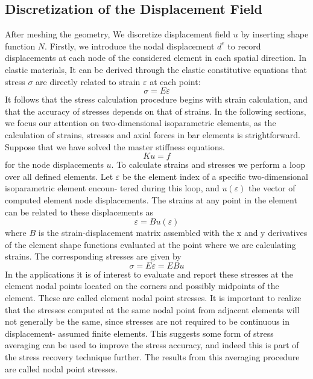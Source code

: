 \subsection{Discretization of the Displacement Field}
After meshing the geometry, We discretize displacement field $u$ by inserting shape function $N$. Firstly, we introduce the nodal displacement $d^e$ to record displacements at each node of the considered element in each spatial direction.
In elastic materials, It can be derived through the elastic constitutive equations that stress $\sigma$ are directly related to strain $\varepsilon$ at each point:
\begin{equation}
\sigma = E\varepsilon
\end{equation}
It follows that the stress calculation procedure begins with strain calculation, and that the accuracy of stresses depends on that of strains. In the following sections, we focus our attention on two-dimensional isoparametric elements, as the calculation of strains, stresses and axial forces in bar elements is strightforward. Suppose that we have solved the master stiffness equations. 
\begin{equation}
Ku = f
\end{equation}
for the node displacements $u$. To calculate strains and stresses we perform a loop over all defined elements. Let $\varepsilon$ be the element index of a specific two-dimensional isoparametric element encoun- tered during this loop, and $u(\varepsilon)$ the vector of computed element node displacements. The strains at any point in the element can be related to these displacements as 
\begin{equation}
\varepsilon = Bu(\varepsilon) 
\end{equation}
where $B$ is the strain-displacement matrix assembled with the x and y derivatives of the element shape functions evaluated at the point where we are calculating strains. The corresponding stresses are given by 
\begin{equation}
\sigma = E\varepsilon = EBu 
\end{equation}
In the applications it is of interest to evaluate and report these stresses at the element nodal points located on the corners and possibly midpoints of the element. These are called element nodal point stresses.
It is important to realize that the stresses computed at the same nodal point from adjacent elements will not generally be the same, since stresses are not required to be continuous in displacement- assumed finite elements. This suggests some form of stress averaging can be used to improve the stress accuracy, and indeed this is part of the stress recovery technique further. The results from this averaging procedure are called nodal point stresses.

